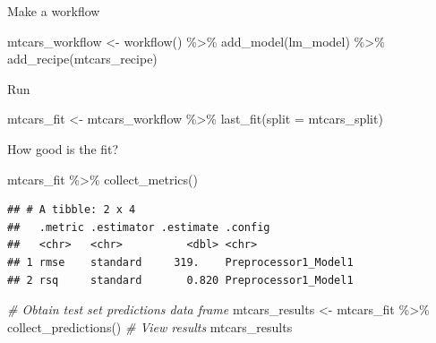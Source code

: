 \documentclass[
]{book}
\newenvironment{Shaded}{\begin{snugshade}}{\end{snugshade}}
\newcommand{\AttributeTok}[1]{\textcolor[rgb]{0.77,0.63,0.00}{#1}}
\newcommand{\CommentTok}[1]{\textcolor[rgb]{0.56,0.35,0.01}{\textit{#1}}}
\newcommand{\FunctionTok}[1]{\textcolor[rgb]{0.00,0.00,0.00}{#1}}
\newcommand{\NormalTok}[1]{#1}
\newcommand{\OtherTok}[1]{\textcolor[rgb]{0.56,0.35,0.01}{#1}}
\newcommand{\SpecialCharTok}[1]{\textcolor[rgb]{0.00,0.00,0.00}{#1}}
\begin{document}
Make a workflow

\begin{Shaded}
\begin{Highlighting}[]
\NormalTok{mtcars\_workflow }\OtherTok{\textless{}{-}} \FunctionTok{workflow}\NormalTok{() }\SpecialCharTok{\%\textgreater{}\%} 
                  \FunctionTok{add\_model}\NormalTok{(lm\_model) }\SpecialCharTok{\%\textgreater{}\%} 
                  \FunctionTok{add\_recipe}\NormalTok{(mtcars\_recipe)}
\end{Highlighting}
\end{Shaded}

Run

\begin{Shaded}
\begin{Highlighting}[]
\NormalTok{mtcars\_fit }\OtherTok{\textless{}{-}}\NormalTok{ mtcars\_workflow }\SpecialCharTok{\%\textgreater{}\%} 
             \FunctionTok{last\_fit}\NormalTok{(}\AttributeTok{split =}\NormalTok{ mtcars\_split)}
\end{Highlighting}
\end{Shaded}

How good is the fit?

\begin{Shaded}
\begin{Highlighting}[]
\NormalTok{mtcars\_fit }\SpecialCharTok{\%\textgreater{}\%} \FunctionTok{collect\_metrics}\NormalTok{()}
\end{Highlighting}
\end{Shaded}

\begin{verbatim}
## # A tibble: 2 x 4
##   .metric .estimator .estimate .config             
##   <chr>   <chr>          <dbl> <chr>               
## 1 rmse    standard     319.    Preprocessor1_Model1
## 2 rsq     standard       0.820 Preprocessor1_Model1
\end{verbatim}

\begin{Shaded}
\begin{Highlighting}[]
\CommentTok{\# Obtain test set predictions data frame}
\NormalTok{mtcars\_results }\OtherTok{\textless{}{-}}\NormalTok{ mtcars\_fit }\SpecialCharTok{\%\textgreater{}\%} 
                 \FunctionTok{collect\_predictions}\NormalTok{()}
\CommentTok{\# View results}
\NormalTok{mtcars\_results}
\end{Highlighting}
\end{Shaded}
\end{document}
